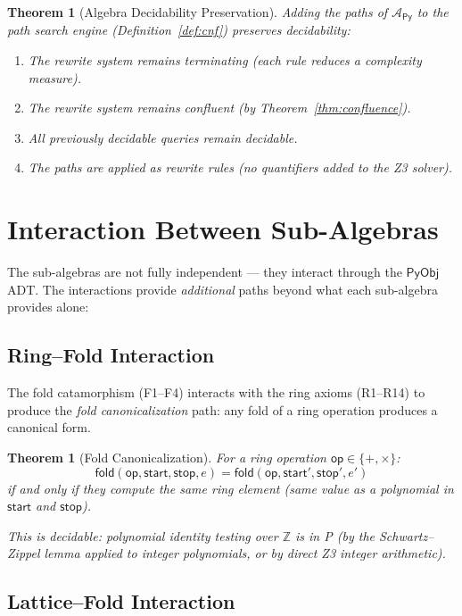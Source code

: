 \documentclass[11pt,a4paper]{report}
\theoremstyle{definition}
\theoremstyle{plain}
\newtheorem{theorem}[definition]{Theorem}
\newcommand{\Int}{\mathbb{Z}}
\newcommand{\PyObj}{\mathsf{PyObj}}
\newcommand{\fold}{\mathsf{fold}}
\newcommand{\op}{\mathsf{op}}
\begin{document}
\begin{theorem}[Algebra Decidability Preservation]
\label{thm:algebra-decidable}
Adding the paths of $\mathcal{A}_\mathsf{Py}$ to the path search
engine (Definition~\ref{def:cnf}) preserves decidability:
\begin{enumerate}
  \item The rewrite system remains terminating (each rule reduces
    a complexity measure).
  \item The rewrite system remains confluent (by Theorem~\ref{thm:confluence}).
  \item All previously decidable queries remain decidable.
  \item The paths are applied as rewrite rules (no quantifiers
    added to the Z3 solver).
\end{enumerate}
\end{theorem}

\section{Interaction Between Sub-Algebras}

The sub-algebras are not fully independent --- they interact through
the $\PyObj$ ADT.  The interactions provide \emph{additional} paths
beyond what each sub-algebra provides alone:

\subsection{Ring--Fold Interaction}

The fold catamorphism (F1--F4) interacts with the ring axioms (R1--R14)
to produce the \emph{fold canonicalization} path: any fold of a ring
operation produces a canonical form.

\begin{theorem}[Fold Canonicalization]
\label{thm:fold-canon}
For a ring operation $\op \in \{+, \times\}$:
\[
  \fold(\op, \mathsf{start}, \mathsf{stop}, e) =
  \fold(\op, \mathsf{start}', \mathsf{stop}', e')
\]
if and only if they compute the same ring element
(same value as a polynomial in $\mathsf{start}$ and $\mathsf{stop}$).

This is decidable: polynomial identity testing over $\Int$ is in P
(by the Schwartz--Zippel lemma applied to integer polynomials, or
by direct Z3 integer arithmetic).
\end{theorem}

\subsection{Lattice--Fold Interaction}
\end{document}
